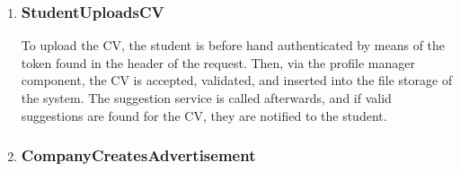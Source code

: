\begin{enumerate}[label=\textbf{RV\arabic* -}]
\begin{figure}[H]
    \centering
\end{figure}

\item \subsubsection{StudentUploadsCV}

To upload the CV, the student is before hand authenticated by means of the token found in the header of the request.
Then, via the profile manager component, the CV is accepted, validated, and inserted into the file storage of the system.
The suggestion service is called afterwards, and if valid suggestions are found for the CV, they are notified to the student.

\begin{figure}[H]
    \centering
\end{figure}

\item \subsubsection{CompanyCreatesAdvertisement}


\end{enumerate}
